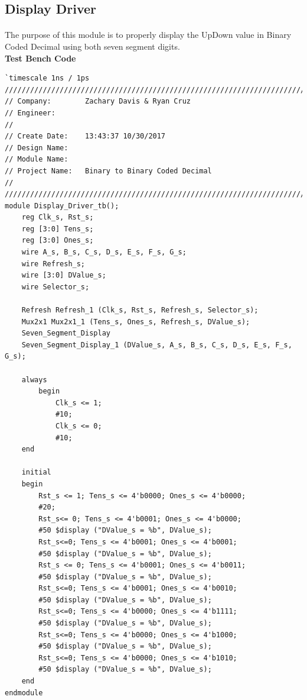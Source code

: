 \documentclass[12pt]{report}
\begin{document}
\subsection*{Display Driver}
		\paragraph*{}
		The purpose of this module is to properly display the UpDown value in Binary Coded Decimal using both seven segment digits.
		\vspace{0.3cm}\\
		\textbf{Test Bench Code}
			\begin{Verbatim}[frame=single, fontsize=\small]
`timescale 1ns / 1ps
////////////////////////////////////////////////////////////////////////////////
// Company:        Zachary Davis & Ryan Cruz
// Engineer: 
// 
// Create Date:    13:43:37 10/30/2017 
// Design Name: 
// Module Name:    
// Project Name:   Binary to Binary Coded Decimal
//
////////////////////////////////////////////////////////////////////////////////
module Display_Driver_tb();
	reg Clk_s, Rst_s;
	reg [3:0] Tens_s;
	reg [3:0] Ones_s;
	wire A_s, B_s, C_s, D_s, E_s, F_s, G_s; 
	wire Refresh_s;
	wire [3:0] DValue_s;
	wire Selector_s;
	
	Refresh Refresh_1 (Clk_s, Rst_s, Refresh_s, Selector_s);
	Mux2x1 Mux2x1_1 (Tens_s, Ones_s, Refresh_s, DValue_s);
	Seven_Segment_Display 
	Seven_Segment_Display_1 (DValue_s, A_s, B_s, C_s, D_s, E_s, F_s, G_s);
		
	always
		begin
			Clk_s <= 1;
			#10;
			Clk_s <= 0;
			#10;
	end
	
	initial 
	begin
		Rst_s <= 1; Tens_s <= 4'b0000; Ones_s <= 4'b0000;
		#20;
		Rst_s<= 0; Tens_s <= 4'b0001; Ones_s <= 4'b0000;
		#50 $display ("DValue_s = %b", DValue_s);
		Rst_s<=0; Tens_s <= 4'b0001; Ones_s <= 4'b0001;
		#50 $display ("DValue_s = %b", DValue_s);
		Rst_s <= 0; Tens_s <= 4'b0001; Ones_s <= 4'b0011;
		#50 $display ("DValue_s = %b", DValue_s);
		Rst_s<=0; Tens_s <= 4'b0001; Ones_s <= 4'b0010;
		#50 $display ("DValue_s = %b", DValue_s);
		Rst_s<=0; Tens_s <= 4'b0000; Ones_s <= 4'b1111;
		#50 $display ("DValue_s = %b", DValue_s);
		Rst_s<=0; Tens_s <= 4'b0000; Ones_s <= 4'b1000;
		#50 $display ("DValue_s = %b", DValue_s);
		Rst_s<=0; Tens_s <= 4'b0000; Ones_s <= 4'b1010;
		#50 $display ("DValue_s = %b", DValue_s);
	end
endmodule
			\end{Verbatim}

		\paragraph*{}
\end{document}
